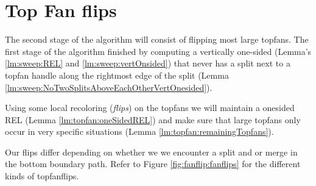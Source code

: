 
\section{Top Fan flips}
\label{s:fanflip}

The second stage of the algorithm will consist of flipping most large topfans. The first stage of the algorithm finished by computing a vertically one-sided \rel (Lemma's \ref{lm:sweep:REL} and \ref{lm:sweep:vertOnsided}) that never has a split next to a topfan handle along the rightmost edge of the split (Lemma \ref{lm:sweep:NoTwoSplitsAboveEachOtherVertOnesided}).

Using some local recoloring (\emph{flips}) on the topfans we will maintain a onesided REL (Lemma \ref{lm:topfan:oneSidedREL}) and make sure that large topfans only occur in very specific situations (Lemma \ref{lm:topfan:remainingTopfans}).

Our flips differ depending on whether we we encounter a split and or merge in the bottom boundary path. Refer to Figure \ref{fig:fanflip:fanflips} for the different kinds of topfanflips.


